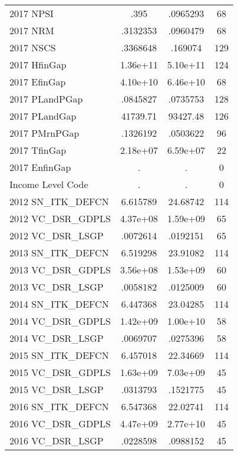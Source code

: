 {\begin{tabular}{l*{1}{ccc}}
2017 NPSI           &        .395&    .0965293&          68\\
2017 NRM            &    .3132353&    .0960479&          68\\
2017 NSCS           &    .3368648&     .169074&         129\\
2017 HfinGap        &    1.36e+11&    5.10e+11&         124\\
2017 EfinGap        &    4.10e+10&    6.46e+10&          68\\
2017 PLandPGap      &    .0845827&    .0735753&         128\\
2017 PLandGap       &    41739.71&    93427.48&         126\\
2017 PMrnPGap       &    .1326192&    .0503622&          96\\
2017 TfinGap        &    2.18e+07&    6.59e+07&          22\\
2017 EnfinGap       &           .&           .&           0\\
Income Level Code   &           .&           .&           0\\
2012 SN\_ITK\_DEFCN   &    6.615789&    24.68742&         114\\
2012 VC\_DSR\_GDPLS   &    4.37e+08&    1.59e+09&          65\\
2012 VC\_DSR\_LSGP    &    .0072614&    .0192151&          65\\
2013 SN\_ITK\_DEFCN   &    6.519298&    23.91082&         114\\
2013 VC\_DSR\_GDPLS   &    3.56e+08&    1.53e+09&          60\\
2013 VC\_DSR\_LSGP    &    .0058182&    .0125009&          60\\
2014 SN\_ITK\_DEFCN   &    6.447368&    23.04285&         114\\
2014 VC\_DSR\_GDPLS   &    1.42e+09&    1.00e+10&          58\\
2014 VC\_DSR\_LSGP    &    .0069707&    .0275396&          58\\
2015 SN\_ITK\_DEFCN   &    6.457018&    22.34669&         114\\
2015 VC\_DSR\_GDPLS   &    1.63e+09&    7.03e+09&          45\\
2015 VC\_DSR\_LSGP    &    .0313793&    .1521775&          45\\
2016 SN\_ITK\_DEFCN   &    6.547368&    22.02741&         114\\
2016 VC\_DSR\_GDPLS   &    4.47e+09&    2.77e+10&          45\\
2016 VC\_DSR\_LSGP    &    .0228598&    .0988152&          45\\

\end{tabular}}
